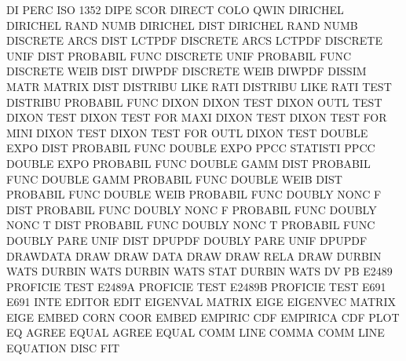 DI       PERC                           ISO      1352 DIPE SCOR
DIRECT   COLO                           QWIN
DIRICHEL                                DIRICHEL RAND NUMB
DIRICHEL DIST                           DIRICHEL RAND NUMB
DISCRETE ARCS DIST                      LCTPDF
DISCRETE ARCS                           LCTPDF
DISCRETE UNIF DIST                      PROBABIL FUNC
DISCRETE UNIF                           PROBABIL FUNC
DISCRETE WEIB DIST                      DIWPDF
DISCRETE WEIB                           DIWPDF
DISSIM   MATR                           MATRIX   DIST
DISTRIBU LIKE RATI                      DISTRIBU LIKE RATI TEST
DISTRIBU                                PROBABIL FUNC
DIXON                                   DIXON    TEST
DIXON    OUTL TEST                      DIXON    TEST
DIXON    TEST FOR  MAXI                 DIXON    TEST
DIXON    TEST FOR  MINI                 DIXON    TEST
DIXON    TEST FOR  OUTL                 DIXON    TEST
DOUBLE   EXPO DIST                      PROBABIL FUNC
DOUBLE   EXPO PPCC                      STATISTI PPCC
DOUBLE   EXPO                           PROBABIL FUNC
DOUBLE   GAMM DIST                      PROBABIL FUNC
DOUBLE   GAMM                           PROBABIL FUNC
DOUBLE   WEIB DIST                      PROBABIL FUNC
DOUBLE   WEIB                           PROBABIL FUNC
DOUBLY   NONC F    DIST                 PROBABIL FUNC
DOUBLY   NONC F                         PROBABIL FUNC
DOUBLY   NONC T    DIST                 PROBABIL FUNC
DOUBLY   NONC T                         PROBABIL FUNC
DOUBLY   PARE UNIF DIST                 DPUPDF
DOUBLY   PARE UNIF                      DPUPDF
DRAWDATA                                DRAW
DRAW     DATA                           DRAW
DRAW     RELA                           DRAW
DURBIN   WATS                           DURBIN   WATS
DURBIN   WATS STAT                      DURBIN   WATS
DV                                      PB
E2489                                   PROFICIE TEST
E2489A                                  PROFICIE TEST
E2489B                                  PROFICIE TEST
E691                                    E691     INTE
EDITOR                                  EDIT
EIGENVAL                                MATRIX   EIGE
EIGENVEC                                MATRIX   EIGE
EMBED    CORN COOR                      EMBED
EMPIRIC  CDF                            EMPIRICA CDF  PLOT
EQ                                      AGREE
EQUAL                                   AGREE
EQUAL    COMM LINE                      COMMA    COMM LINE
EQUATION DISC                           FIT

